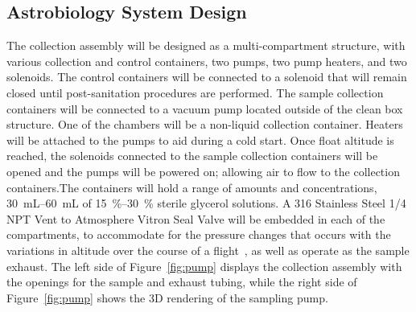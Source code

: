 \subsection{Astrobiology System Design}
\label{sec:Astrobiology Design}

The collection assembly will be designed as a multi-compartment structure, with various collection and control containers, two pumps, two pump heaters, and two solenoids.  The control containers will be connected to a solenoid that will remain closed until post-sanitation procedures are performed. The sample collection containers will be connected to a vacuum pump located outside of the clean box structure.  One of the chambers will be a non-liquid collection container. Heaters will be attached to the pumps to aid during a cold start. Once float altitude is reached, the solenoids connected to the sample collection containers will be opened and the pumps will be powered on; allowing air to flow to the collection containers.The containers will hold a range of amounts and concentrations, \SIrange{30}{60}{\milli\liter} of \SIrange{15}{30}{\%} sterile glycerol solutions. A 316 Stainless Steel \SI{1/4}{\inch} NPT Vent to Atmosphere Vitron Seal Valve will be embedded in each of the compartments, to accommodate for the pressure changes that occurs with the variations in altitude over the course of a flight~\cite{valve}, as well as operate as the sample exhaust.  The left side of Figure~\ref{fig:pump} displays the collection assembly with the openings for the sample and exhaust tubing, while the right side of Figure~\ref{fig:pump} shows the 3D rendering of the sampling pump.  

